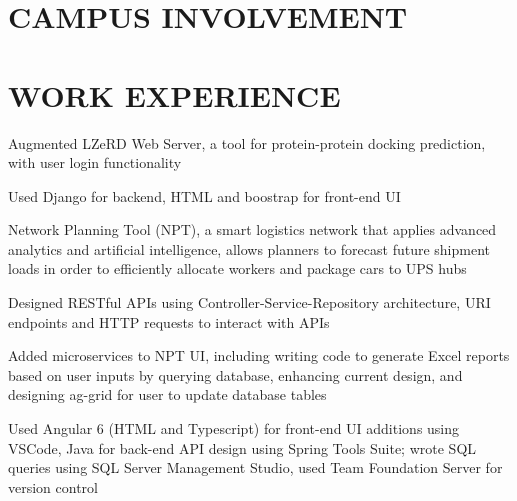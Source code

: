 \documentclass[]{deedy-resume-openfont}
\begin{document}
\begin{minipage}[t]{0.3\textwidth}
\section{CAMPUS INVOLVEMENT} 

\sectionsep



%
%

\end{minipage} 
\hfill
\begin{minipage}[t]{0.67\textwidth} 


\section{WORK EXPERIENCE}

\vspace{\topsep} %
\begin{tightemize}
\item Augmented LZeRD Web Server, a tool for protein-protein docking prediction, with user login functionality
\item Used Django for backend, HTML and boostrap for front-end UI
\end{tightemize}
\sectionsep


\begin{tightemize}
\item Network Planning Tool (NPT), a smart logistics network that applies advanced analytics and artificial intelligence, allows planners to forecast future shipment loads in order to efficiently allocate workers and package cars to UPS hubs
\item Designed RESTful APIs using Controller-Service-Repository architecture, URI endpoints and HTTP requests to interact with APIs
\item Added microservices to NPT UI, including writing code to generate Excel reports based on user inputs by querying database, enhancing current design, and designing ag-grid for user to update database tables
\item Used Angular 6 (HTML and Typescript) for front-end UI additions using VSCode, Java for back-end API design using Spring Tools Suite; wrote SQL queries using SQL Server Management Studio, used Team Foundation Server for version control
\end{tightemize}
\sectionsep


\end{minipage}
\end{document}
